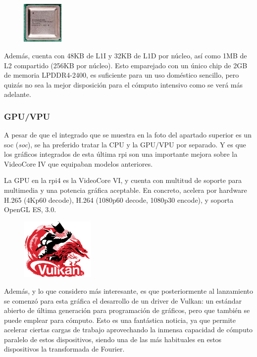 \begin{figure}
  \centering
  \includegraphics[width=0.18\textwidth]{img/rpi_parts/rpi_cpu.jpg}
  \label{fig:rpi_cpu}
\end{figure}
Además, cuenta con 48KB de L1I y 32KB de L1D por núcleo, así como 1MB de L2 compartido (256KB por núcleo). Esto emparejado con un único chip de 2GB de memoria LPDDR4-2400, es suficiente para un uso doméstico sencillo, pero quizás no sea la mejor disposición para el cómputo intensivo como se verá más adelante.

\subsubsection{GPU/VPU}
A pesar de que el integrado que se muestra en la foto del apartado superior es un \acrshort{soc} (\textit{\acrlong{soc}}), se ha preferido tratar la CPU y la GPU/VPU por separado. Y es que los gráficos integrados de esta última \acrlong{rpi} son una importante mejora sobre la VideoCore IV que equipaban modelos anteriores.

La GPU en la \acrshort{rpi}4 es la VideoCore VI, y cuenta con multitud de soporte para multimedia y una potencia gráfica aceptable. En concreto, acelera por hardware H.265 (4Kp60 decode), H.264 (1080p60 decode, 1080p30 encode), y soporta OpenGL ES, 3.0.

\begin{figure}
  \centering
  \includegraphics[width=0.32\textwidth]{img/vulkan_logo.png}
  \label{fig:vulkan_logo}
\end{figure}
Además, y lo que considero más interesante, es que posteriormente al lanzamiento se comenzó para esta gráfica el desarrollo de un driver de Vulkan: un estándar abierto de última generación para programación de gráficos, pero que también se puede emplear para cómputo. Esto es una fantástica noticia, ya que permite acelerar ciertas cargas de trabajo aprovechando la inmensa capacidad de cómputo paralelo de estos dispositivos, siendo una de las más habituales en estos dispositivos la transformada de Fourier.

